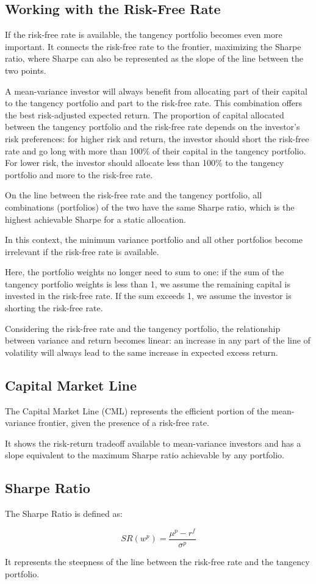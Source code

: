 \documentclass{article}
\begin{document}
\subsection{Working with the Risk-Free Rate}
If the risk-free rate is available, the tangency portfolio becomes even more important. It connects the risk-free rate to the frontier, maximizing the Sharpe ratio, where Sharpe can also be represented as the slope of the line between the two points.

A mean-variance investor will always benefit from allocating part of their capital to the tangency portfolio and part to the risk-free rate. This combination offers the best risk-adjusted expected return. The proportion of capital allocated between the tangency portfolio and the risk-free rate depends on the investor's risk preferences: for higher risk and return, the investor should short the risk-free rate and go long with more than 100\% of their capital in the tangency portfolio. For lower risk, the investor should allocate less than 100\% to the tangency portfolio and more to the risk-free rate.

On the line between the risk-free rate and the tangency portfolio, all combinations (portfolios) of the two have the same Sharpe ratio, which is the highest achievable Sharpe for a static allocation.

In this context, the minimum variance portfolio and all other portfolios become irrelevant if the risk-free rate is available.

Here, the portfolio weights no longer need to sum to one: if the sum of the tangency portfolio weights is less than 1, we assume the remaining capital is invested in the risk-free rate. If the sum exceeds 1, we assume the investor is shorting the risk-free rate.

Considering the risk-free rate and the tangency portfolio, the relationship between variance and return becomes linear: an increase in any part of the line of volatility will always lead to the same increase in expected excess return.

\subsection{Capital Market Line}
The Capital Market Line (CML) represents the efficient portion of the mean-variance frontier, given the presence of a risk-free rate.

It shows the risk-return tradeoff available to mean-variance investors and has a slope equivalent to the maximum Sharpe ratio achievable by any portfolio.

\subsection{Sharpe Ratio}
The Sharpe Ratio is defined as:

$$
SR({w}^{p})=\frac{{\mu}^{p}-r^{f}}{{\sigma}^{p}}
$$

It represents the steepness of the line between the risk-free rate and the tangency portfolio.
\end{document}
